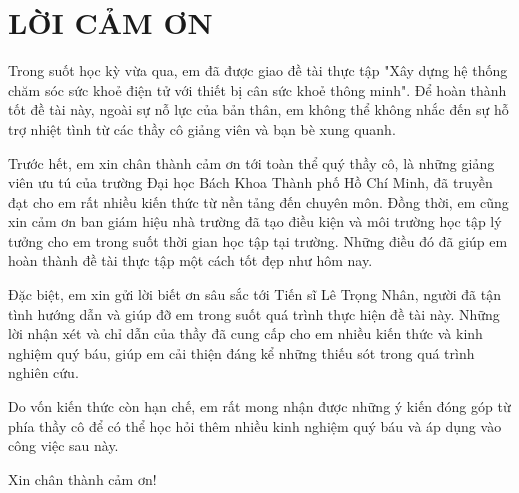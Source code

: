 \section*{LỜI CẢM ƠN}

Trong suốt học kỳ vừa qua, em đã được giao đề tài thực tập "Xây dựng hệ thống chăm sóc sức khoẻ điện tử với thiết bị cân sức khoẻ thông minh". Để hoàn thành tốt đề tài này, ngoài sự nỗ lực của bản thân, em không thể không nhắc đến sự hỗ trợ nhiệt tình từ các thầy cô giảng viên và bạn bè xung quanh.

Trước hết, em xin chân thành cảm ơn tới toàn thể quý thầy cô, là những giảng viên ưu tú của trường Đại học Bách Khoa Thành phố Hồ Chí Minh, đã truyền đạt cho em rất nhiều kiến thức từ nền tảng đến chuyên môn. Đồng thời, em cũng xin cảm ơn ban giám hiệu nhà trường đã tạo điều kiện và môi trường học tập lý tưởng cho em trong suốt thời gian học tập tại trường. Những điều đó đã giúp em hoàn thành đề tài thực tập một cách tốt đẹp như hôm nay.

Đặc biệt, em xin gửi lời biết ơn sâu sắc tới Tiến sĩ Lê Trọng Nhân, người đã tận tình hướng dẫn và giúp đỡ em trong suốt quá trình thực hiện đề tài này. Những lời nhận xét và chỉ dẫn của thầy đã cung cấp cho em nhiều kiến thức và kinh nghiệm quý báu, giúp em cải thiện đáng kể những thiếu sót trong quá trình nghiên cứu.

Do vốn kiến thức còn hạn chế, em rất mong nhận được những ý kiến đóng góp từ phía thầy cô để có thể học hỏi thêm nhiều kinh nghiệm quý báu và áp dụng vào công việc sau này.

Xin chân thành cảm ơn!